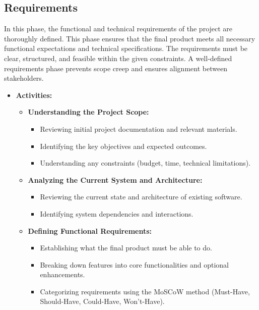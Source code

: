 \documentclass{article}
\begin{document}
\subsection{Requirements}
In this phase, the functional and technical requirements of the project are thoroughly defined. This phase ensures that the final product meets all necessary functional expectations and technical specifications. The requirements must be clear, structured, and feasible within the given constraints. A well-defined requirements phase prevents scope creep and ensures alignment between stakeholders.

\begin{itemize}[leftmargin=*, label={}]
    \item \textbf{Activities:}
        \begin{itemize}
            \item \textbf{Understanding the Project Scope:}
                \begin{itemize}
                    \item Reviewing initial project documentation and relevant materials.
                    \item Identifying the key objectives and expected outcomes.
                    \item Understanding any constraints (budget, time, technical limitations).
                \end{itemize}
            \item \textbf{Analyzing the Current System and Architecture:}
                \begin{itemize}
                    \item Reviewing the current state and architecture of existing software.
                    \item Identifying system dependencies and interactions.
                \end{itemize}
            \item \textbf{Defining Functional Requirements:}
                \begin{itemize}
                    \item Establishing what the final product must be able to do.
                    \item Breaking down features into core functionalities and optional enhancements.
                    \item Categorizing requirements using the MoSCoW method (Must-Have, Should-Have, Could-Have, Won't-Have).
                \end{itemize}

\end{itemize}
\end{itemize}
\end{document}
